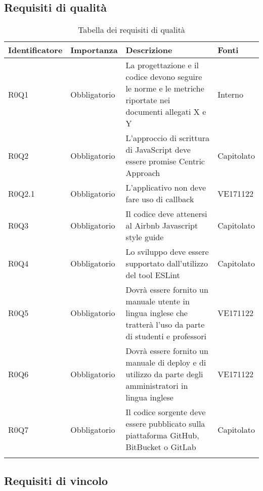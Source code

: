 \documentclass[AnalisiDeiRequisiti.tex]{subfiles}
\begin{document}
\subsection{Requisiti di qualità}

\label{table:Tabella requisiti di qualita'} %
\begin{longtable}[H]{|p{2.5cm}|p{2.5cm}|p{5cm}|p{2cm}|}
	\hline
	\rowcolor[HTML]{38FFF8} 
	\textbf{Identificatore} & \textbf{Importanza} & \textbf{Descrizione} & \textbf{Fonti} \\ \hline
	\endhead
	R0Q1 & Obbligatorio & La progettazione e il codice devono seguire le norme e le metriche riportate nei documenti allegati X e Y & Interno \\ \hline %
	R0Q2 & Obbligatorio & L'approccio di scrittura di JavaScript deve essere promise Centric Approach & Capitolato \\ \hline
	R0Q2.1 & Obbligatorio & L'applicativo non deve fare uso di callback & VE171122 \\ \hline
	R0Q3 & Obbligatorio & Il codice deve attenersi al Airbnb Javascript style guide & Capitolato \\ \hline
	R0Q4 & Obbligatorio & Lo sviluppo deve essere supportato dall'utilizzo del tool ESLint & Capitolato \\ \hline
	R0Q5 & Obbligatorio & Dovrà essere fornito un manuale utente in lingua inglese che tratterà l'uso da parte di studenti e professori & VE171122 \\ \hline
	R0Q6 & Obbligatorio & Dovrà essere fornito un manuale di deploy e di utilizzo da parte degli amministratori in lingua inglese & VE171122 \\ \hline
	R0Q7 & Obbligatorio & Il codice sorgente deve essere pubblicato sulla piattaforma GitHub, BitBucket o GitLab & Capitolato \\ \hline
	\caption{Tabella dei requisiti di qualità}
\end{longtable}

\subsection{Requisiti di vincolo}

\label{table:Tabella requisiti di vincolo}
\end{document}
